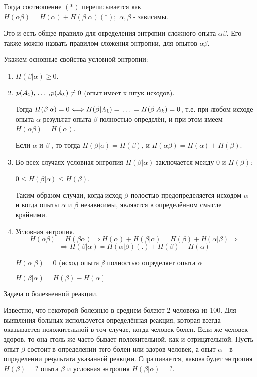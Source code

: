 \documentclass[a4paper,12pt]{report}
\begin{document}
	Тогда соотношение $(*)$ переписывается как $H(\alpha\beta) = H(\alpha) + H(\beta|\alpha) (*);$ $ \alpha, \beta \mbox{ - зависимы}$.

	Это и есть общее правило для определения энтропии сложного опыта $\alpha\beta$. Его также можно назвать правилом сложения энтропии, для  опытов $\alpha\beta$.
	
	Укажем основные свойства условной энтропии:


	\begin{enumerate}
	
	\item	$H(\beta|\alpha) \ge 0$.
	
	\item	$p(A_1), \,\ldots\,, p(A_k) \not = 0$ (опыт имеет к штук исходов).
		
		Тогда $H(\beta|\alpha) = 0 \Longleftrightarrow H(\beta|A_1) = \,\ldots\, = H(\beta|A_k) = 0$, т.е. при любом исходе опыта $\alpha$ результат опыта $\beta$ полностью определён, и при этом имеем 
		$H(\alpha\beta) = H(\alpha)$.
		
		Если $\alpha$ и $\beta$ , то тогда $H(\beta|\alpha) = H(\beta)$, и $H(\alpha\beta) = H(\alpha)+H(\beta)$.
	
	\item	Во всех случаях условная энтропия $H(\beta|\alpha)$ заключается между $0$ и $H(\beta)$:	
		
		$0 \le H(\beta|\alpha) \le H(\beta)$. 

		Таким образом случаи, когда исход $\beta$ полостью предопределяется исходом $\alpha$ и когда опыты $\alpha$ и $\beta$ независимы, являются в определённом смысле крайними.	

	\item 	Условная энтропия. 
		$$
		  H(\alpha\beta) = H(\beta\alpha) \Rightarrow 
		    H(\alpha) + H(\beta|\alpha) 
		     = H(\beta) + H(\alpha|\beta) \Rightarrow	     
		$$ $$ \Rightarrow
		    H(\beta|\alpha)
		     = H(\alpha|\beta)(.) + H(\beta) - H(\alpha)
		$$
		
		$H(\alpha|\beta) = 0$ (исход опыта $\beta$ полностью определяет опыта $\alpha$
		
		$H(\beta|\alpha) = H(\beta) - H(\alpha)$
		
	\end{enumerate}

	
		Задача о болезненной реакции. 
		
		Известно, что некоторой болезнью в среднем болеют 2 человека из 100. Для выявления больных используется определённая реакция, которая всегда оказывается положительной в том случае, когда человек болен. Если же человек здоров, то она столь же часто бывает положительной, как и отрицательной. Пусть опыт $\beta$ состоит в определении того болен или здоров человек, а опыт $\alpha$ - в определении результата указанной реакции. Спрашивается, какова будет энтропия $H(\beta) = ?$ опыта $\beta$ и условная энтропия $H(\beta|\alpha) = ?$.
	
\end{document}
